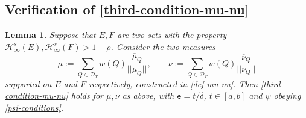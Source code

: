\documentclass[a4paper,11pt]{amsart}
\newtheorem{lem}[thm]{\bf Lemma}
\numberwithin{equation}{section}
\begin{document}
\subsection{Verification of \eqref{third-condition-mu-nu}} \label{third-condition-verification} 
\begin{lem} \label{third-condition-verification-lemma}
Suppose that $E, F$ are two sets with the property $\mathcal H^s_{\infty}(E), \mathcal H^s_{\infty}(F) > 1 - \rho$. Consider the two measures  
\begin{equation} \mu := \sum_{Q \in \mathscr{D}_T} w(Q) \frac{\overline{\mu}_Q}{||\overline{\mu}_Q||}, \qquad \nu := \sum_{Q \in \mathscr{D}_T} w(Q) \frac{\overline{\nu}_Q}{||\overline{\nu}_Q||} \label{munu-sum} \end{equation} 
supported on $E$ and $F$ respectively, constructed in \eqref{def-mu-nu}. Then \eqref{third-condition-mu-nu} holds for $\mu, \nu$ as above, with 
$\mathtt e = t/\delta$, $t \in [a, b]$ and $\psi$ obeying \eqref{psi-conditions}.
\end{lem} 
\end{document}
